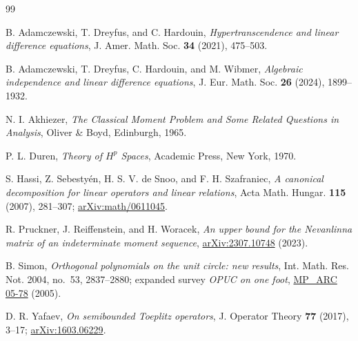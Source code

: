 \documentclass[11pt]{article}
\begin{document}
\begin{thebibliography}{99}

B. Adamczewski, T. Dreyfus, and C. Hardouin,
\emph{Hypertranscendence and linear difference equations},
J. Amer. Math. Soc. \textbf{34} (2021), 475--503.

B. Adamczewski, T. Dreyfus, C. Hardouin, and M. Wibmer,
\emph{Algebraic independence and linear difference equations},
J. Eur. Math. Soc. \textbf{26} (2024), 1899--1932.

N. I. Akhiezer,
\emph{The Classical Moment Problem and Some Related Questions in Analysis},
Oliver \& Boyd, Edinburgh, 1965.

P. L. Duren,
\emph{Theory of $H^p$ Spaces},
Academic Press, New York, 1970.

S. Hassi, Z. Sebesty\'en, H. S. V. de Snoo, and F. H. Szafraniec,
\emph{A canonical decomposition for linear operators and linear relations},
Acta Math. Hungar. \textbf{115} (2007), 281--307;
\href{https://arxiv.org/abs/math/0611045}{arXiv:math/0611045}.

R. Pruckner, J. Reiffenstein, and H. Woracek,
\emph{An upper bound for the Nevanlinna matrix of an indeterminate moment sequence},
\href{https://arxiv.org/abs/2307.10748}{arXiv:2307.10748} (2023).

B. Simon,
\emph{Orthogonal polynomials on the unit circle: new results},
Int. Math. Res. Not. 2004, no.~53, 2837--2880;
expanded survey \emph{OPUC on one foot},
\href{https://web.ma.utexas.edu/mp_arc/c/05/05-78.pdf}{MP\_ARC 05-78} (2005).

D. R. Yafaev,
\emph{On semibounded Toeplitz operators},
J. Operator Theory \textbf{77} (2017), 3--17;
\href{https://arxiv.org/abs/1603.06229}{arXiv:1603.06229}.

\end{thebibliography}
\end{document}
